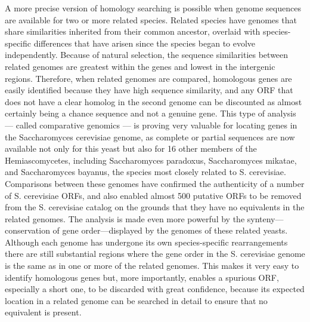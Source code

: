 A more precise version of homology searching is possible when genome sequences are available for two or more related species. Related species have
genomes that share similarities inherited from their common ancestor, overlaid with species-specific differences that have arisen since the species began
to evolve independently. Because of natural selection, the sequence similarities between related genomes are greatest within the genes and lowest in the 
intergenic regions. Therefore, when related genomes are compared, homologous genes are easily identified because they have high sequence similarity, 
and any ORF that does not have a clear homolog in the second genome can be discounted as almost certainly being a chance sequence and not a genuine gene. 
This type of analysis — called comparative genomics — is proving very valuable for locating genes in the Saccharomyces cerevisiae genome, as complete or partial
sequences are now available not only for this yeast but also for 16 other members of the Hemiascomycetes, including Saccharomyces paradoxus,
Saccharomyces mikatae, and Saccharomyces bayanus, the species most closely related to S. cerevisiae. Comparisons between these genomes have
confirmed the authenticity of a number of S. cerevisiae ORFs, and also enabled almost 500 putative ORFs to be removed from the S. cerevisiae catalog on the 
grounds that they have no equivalents in the related genomes. The analysis is made even more powerful by the synteny—conservation of gene
order—displayed by the genomes of these related yeasts. Although each genome has undergone its own species-specific rearrangements there are still
substantial regions where the gene order in the S. cerevisiae genome is the same as in one or more of the related genomes. This makes it very easy to
identify homologous genes but, more importantly, enables a spurious ORF, especially a short one, to be discarded with great confidence, because its
expected location in a related genome can be searched in detail to ensure that no equivalent is present.

